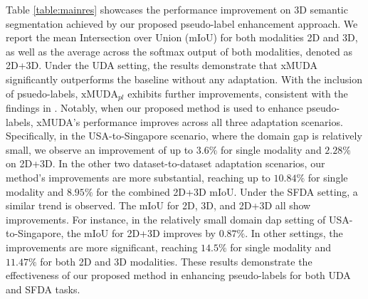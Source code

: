 Table \ref{table:mainres} showcases the performance improvement on 3D semantic segmentation achieved by our proposed pseudo-label enhancement approach. We report the mean Intersection over Union (mIoU) for both modalities 2D and 3D, as well as the average across the softmax output of both modalities, denoted as 2D+3D. Under the UDA setting, the results demonstrate that xMUDA significantly outperforms the baseline without any adaptation. With the inclusion of psuedo-labels, $\text{xMUDA}_{pl}$ exhibits further improvements, consistent with the findings in \cite{jaritz2020xmuda}. Notably, when our proposed method is used to enhance pseudo-labels, xMUDA's performance improves across all three adaptation scenarios. Specifically, in the USA-to-Singapore scenario, where the domain gap is relatively small, we observe an improvement of up to $3.6\%$ for single modality and $2.28\%$ on 2D+3D. In the other two dataset-to-dataset adaptation scenarios, our method's improvements are more substantial, reaching up to $10.84\%$ for single modality and $8.95\%$ for the combined 2D+3D mIoU.
Under the SFDA setting, a similar trend is observed. The mIoU for 2D, 3D, and 2D+3D all show improvements. For instance, in the relatively small domain dap setting of USA-to-Singapore, the mIoU for 2D+3D improves by $0.87\%$. In other settings, the improvements are more significant, reaching $14.5\%$ for single modality and $11.47\%$ for both 2D and 3D modalities. These results demonstrate the effectiveness of our proposed method in enhancing pseudo-labels for both UDA and SFDA tasks.


